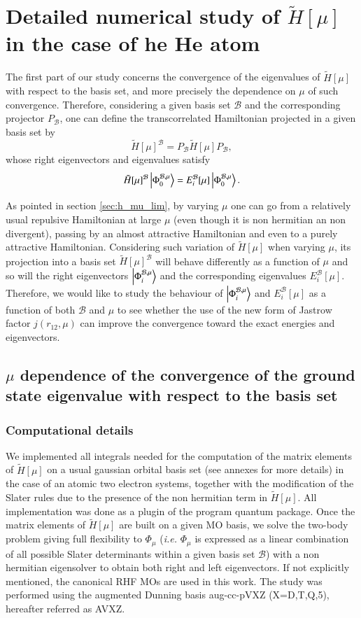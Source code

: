 \documentclass[aip,jcp,reprint,noshowkeys,superscriptaddress]{revtex4-1}
\newcommand{\phimub}[0]{\Phi^{\mathcal{B},\mu}_0}
\newcommand{\phiimub}[0]{\Phi^{\mathcal{B},\mu}_i}
\newcommand{\basis}[0]{\mathcal{B}}
\begin{document}
\section{Detailed numerical study of $\tilde{H}[\mu]$ in the case of he He atom}
The first part of our study concerns the convergence of the eigenvalues of $\tilde{H}[\mu]$ with respect to the basis set, and more precisely the dependence on $\mu$ of such convergence. 
Therefore, considering a given basis set $\basis$ and the corresponding projector $P_\basis$, one can define the transcorrelated Hamiltonian projected in a given basis set by
\begin{equation}
 \tilde{H}[\mu]^{\basis} = P_\basis \tilde{H}[\mu] P_\basis,
\end{equation}
whose right eigenvectors and eigenvalues satisfy 
\begin{equation}
 \tilde{H}[\mu]^{\basis} \ket{\phimub} = E_i^{\basis}[\mu] \ket{\phimub}. 
\end{equation}

As pointed in section \ref{sec:h_mu_lim}, by varying $\mu$ one can go from a relatively usual repulsive Hamiltonian at large $\mu$ (even though it is non hermitian an non divergent), passing by an almost attractive Hamiltonian and even to a purely attractive Hamiltonian. 
Considering such variation of $\tilde{H}[\mu]$ when varying $\mu$,  
its projection into a basis set $\tilde{H}[\mu]^{\basis}$ will behave differently as a function of $\mu$ 
and so will the right eigenvectors $\ket{\phiimub}$ and the corresponding eigenvalues $E_i^{\basis}[\mu]$. 
Therefore, we would like to study the behaviour of $\ket{\phiimub}$ and $E_i^{\basis}[\mu]$ as a function of both $\basis$ and $\mu$ to see whether the use of the new form of Jastrow factor $j(r_{12},\mu)$ can improve the convergence toward the exact energies  and eigenvectors. 
\subsection{$\mu$ dependence of the convergence of the ground state eigenvalue with respect to the basis set }
\subsubsection{Computational details}
We implemented all integrals needed for the computation of the matrix elements of $\tilde{H}[\mu]$ on a usual gaussian orbital basis set (see annexes for more details) in the case of an atomic two electron systems, together with the modification of the Slater rules due to the presence of the non hermitian term in $\tilde{H}[\mu]$. 
All implementation was done as a plugin of the program quantum package\cite{QP2}. 
Once the matrix elements of $\tilde{H}[\mu]$ are built on a given MO basis, we solve the two-body problem giving full flexibility to $\Phi_\mu$ (\textit{i.e.} $\Phi_\mu$ is expressed as a linear combination of all possible Slater determinants within a given basis set $\basis$) with a non hermitian eigensolver to obtain both right and left eigenvectors. If not explicitly mentioned, the canonical RHF MOs are used in this work. 
The study was performed using the augmented Dunning basis aug-cc-pVXZ (X=D,T,Q,5), hereafter referred as AVXZ. 
\end{document}
